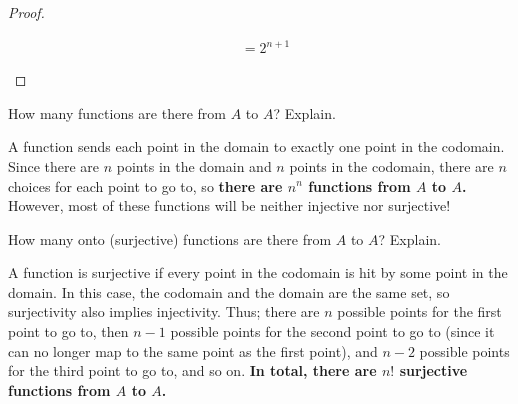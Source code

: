 \begin{problem}
\begin{enumalph}
\begin{answer}
\begin{proof}
\begin{enumroman}
\begin{align*}
                                                &= 2^{n+1}
              \end{align*}
          \end{enumroman}
        \end{proof}
      \end{answer}
    \item How many functions are there from $A$ to $A$? Explain.
      \begin{answer}
        A function sends each point in the domain to exactly one point in the
        codomain. Since there are $n$ points in the domain
        and $n$ points in the codomain, there are $n$ choices for each point
        to go to, so \textbf{there are $n^n$ functions from $A$ to $A$.}
        However, most of these functions will be neither injective nor surjective!

      \end{answer}
    \item How many onto (surjective) functions are there from $A$ to $A$? Explain.
      \begin{answer}
        A function is surjective if every point in the codomain is hit by
        some point in the domain. In this case, the codomain and the domain
        are the same set, so surjectivity also implies injectivity.
        Thus; there are $n$ possible points for the first point to go to,
        then $n-1$ possible points for the second point to go to
        (since it can no longer map to the same point as the first point),
        and $n-2$ possible points for the third point to go to, and so on.
        \textbf{In total, there are $n!$ surjective functions from $A$ to $A$.}
      \end{answer}
  \end{enumalph}
\end{problem}
